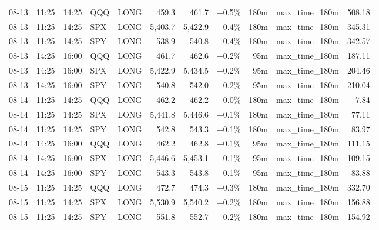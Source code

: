 \documentclass[11pt,a4paper,twoside]{article}
\begin{document}
\begin{center}
\begin{longtable}{>{\color{txtmain}}l l l l l r r r r >{\color{txtmain}}l r}
08-13 & 11:25 & 14:25 & QQQ & LONG & 459.3 & 461.7 & \textcolor{wingreen}{+0.5\%} & 180m & max\_time\_180m & \textcolor{wingreen}{508.18} \\
08-13 & 11:25 & 14:25 & SPX & LONG & 5,403.7 & 5,422.9 & \textcolor{wingreen}{+0.4\%} & 180m & max\_time\_180m & \textcolor{wingreen}{345.31} \\
08-13 & 11:25 & 14:25 & SPY & LONG & 538.9 & 540.8 & \textcolor{wingreen}{+0.4\%} & 180m & max\_time\_180m & \textcolor{wingreen}{342.57} \\
08-13 & 14:25 & 16:00 & QQQ & LONG & 461.7 & 462.6 & \textcolor{wingreen}{+0.2\%} & 95m & max\_time\_180m & \textcolor{wingreen}{187.11} \\
08-13 & 14:25 & 16:00 & SPX & LONG & 5,422.9 & 5,434.5 & \textcolor{wingreen}{+0.2\%} & 95m & max\_time\_180m & \textcolor{wingreen}{204.46} \\
08-13 & 14:25 & 16:00 & SPY & LONG & 540.8 & 542.0 & \textcolor{wingreen}{+0.2\%} & 95m & max\_time\_180m & \textcolor{wingreen}{210.04} \\
08-14 & 11:25 & 14:25 & QQQ & LONG & 462.2 & 462.2 & \textcolor{wingreen}{+0.0\%} & 180m & max\_time\_180m & \textcolor{lossred}{-7.84} \\
08-14 & 11:25 & 14:25 & SPX & LONG & 5,441.8 & 5,446.6 & \textcolor{wingreen}{+0.1\%} & 180m & max\_time\_180m & \textcolor{wingreen}{77.11} \\
08-14 & 11:25 & 14:25 & SPY & LONG & 542.8 & 543.3 & \textcolor{wingreen}{+0.1\%} & 180m & max\_time\_180m & \textcolor{wingreen}{83.97} \\
08-14 & 14:25 & 16:00 & QQQ & LONG & 462.2 & 462.8 & \textcolor{wingreen}{+0.1\%} & 95m & max\_time\_180m & \textcolor{wingreen}{111.15} \\
08-14 & 14:25 & 16:00 & SPX & LONG & 5,446.6 & 5,453.1 & \textcolor{wingreen}{+0.1\%} & 95m & max\_time\_180m & \textcolor{wingreen}{109.15} \\
08-14 & 14:25 & 16:00 & SPY & LONG & 543.3 & 543.8 & \textcolor{wingreen}{+0.1\%} & 95m & max\_time\_180m & \textcolor{wingreen}{83.88} \\
08-15 & 11:25 & 14:25 & QQQ & LONG & 472.7 & 474.3 & \textcolor{wingreen}{+0.3\%} & 180m & max\_time\_180m & \textcolor{wingreen}{332.70} \\
08-15 & 11:25 & 14:25 & SPX & LONG & 5,530.9 & 5,540.2 & \textcolor{wingreen}{+0.2\%} & 180m & max\_time\_180m & \textcolor{wingreen}{156.88} \\
08-15 & 11:25 & 14:25 & SPY & LONG & 551.8 & 552.7 & \textcolor{wingreen}{+0.2\%} & 180m & max\_time\_180m & \textcolor{wingreen}{154.92} \\

\end{longtable}
\end{center}
\end{document}
